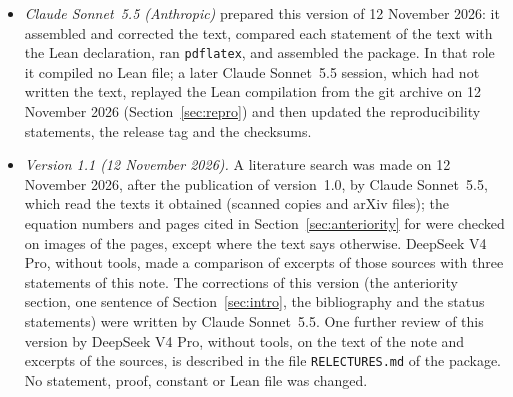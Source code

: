 \documentclass[11pt,a4paper]{article}
\theoremstyle{plain}
\theoremstyle{definition}
\theoremstyle{remark}
\numberwithin{equation}{section}
\begin{document}
\begin{itemize}
\item \emph{Claude Sonnet~5.5 (Anthropic)} prepared this version of 12 November 2026: it assembled and corrected the text, compared each statement of the text with the Lean declaration, ran \texttt{pdflatex}, and assembled the package. In that role it compiled no Lean file; a later Claude Sonnet~5.5 session, which had not written the text, replayed the Lean compilation from the git archive on 12 November 2026 (Section~\ref{sec:repro}) and then updated the reproducibility statements, the release tag and the checksums.
\item \emph{Version 1.1 (12 November 2026).} A literature search was made on 12 November 2026, after the publication of version~1.0, by Claude Sonnet~5.5, which read the texts it obtained (scanned copies and arXiv files); the equation numbers and pages cited in Section~\ref{sec:anteriority} for \cite{TY85,KT02,Kan,BS83,Mih} were checked on images of the pages, except where the text says otherwise. DeepSeek V4 Pro, without tools, made a comparison of excerpts of those sources with three statements of this note. The corrections of this version (the anteriority section, one sentence of Section~\ref{sec:intro}, the bibliography and the status statements) were written by Claude Sonnet~5.5. One further review of this version by DeepSeek V4 Pro, without tools, on the text of the note and excerpts of the sources, is described in the file \texttt{RELECTURES.md} of the package. No statement, proof, constant or Lean file was changed.

\end{itemize}
\end{document}
